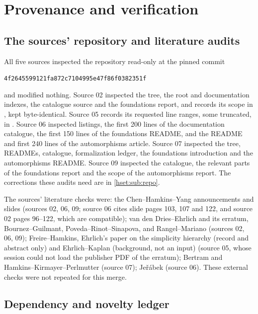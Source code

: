 \documentclass[11pt,letterpaper]{article}
\theoremstyle{definition}
\theoremstyle{remark}
\newcommand{\repoSHA}{\texttt{4f2645599121fa872c7104995e47f86f0382351f}}
\begin{document}
\section{Provenance and verification}
\label{hset:sec:audit}

\subsection{The sources' repository and literature audits}

All five sources inspected the repository read-only at the pinned commit
\begin{center}\repoSHA\end{center}
and modified nothing. Source 02 inspected the tree, the root and documentation indexes, the
catalogue source and the foundations report, and records its scope in
, kept byte-identical. Source 05
records its requested line ranges, some truncated, in
. Source 06
inspected listings, the first 200 lines of the documentation catalogue, the
first 150 lines of the foundations README, and the README and first 240 lines
of the automorphisms article. Source 07 inspected the tree, READMEs, catalogue,
formalization ledger, the foundations introduction and the automorphisms README.
Source 09 inspected the catalogue, the relevant parts of the foundations report
and the scope of the automorphisms report. The corrections these audits need
are in \cref{hset:sub:repo}.

The sources' literature checks were: the Chen--Hamkins--Yang announcements and
slides (sources 02, 06, 09; source 06 cites slide pages 103, 107 and 122, and
source 02 pages 96--122, which are compatible); van den Dries--Ehrlich and its
erratum, Bournez--Guilmant, Poveda--Rinot--Sinapova, and Rangel--Mariano
(sources 02, 06, 09); Freire--Hamkins, Ehrlich's paper on the simplicity
hierarchy \cite{EhrlichTree} (record and abstract only) and Ehrlich--Kaplan
\cite{EhrlichKaplan} (background, not an input) (source 05, whose session could
not load the publisher PDF of the erratum); Bertram and Hamkins--Kirmayer--Perlmutter
(source 07); Je\v{r}\'abek (source 06). These external checks were not repeated
for this merge.

\subsection{Dependency and novelty ledger}
\end{document}
